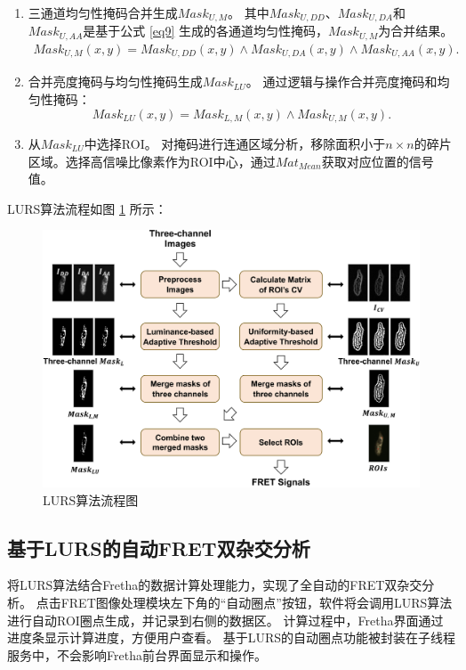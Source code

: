 \begin{enumerate}
\item {三通道均匀性掩码合并生成${Mask}_{U,M}$。}  
其中${Mask}_{U,DD}$、${Mask}_{U,DA}$和${Mask}_{U,AA}$是基于公式 \ref{eq9} 生成的各通道均匀性掩码，${Mask}_{U,M}$为合并结果。
\begin{equation}
    \begin{split}
    {Mask}_{U,M}(x,y)={Mask}_{U,DD}(x,y) \land {Mask}_{U,DA}(x,y) \land {Mask}_{U,AA}(x,y) .
    \end{split}
    \label{eq_merge_u}
\end{equation}
\item {合并亮度掩码与均匀性掩码生成${Mask}_{LU}$。}  
通过逻辑与操作合并亮度掩码和均匀性掩码：
\begin{equation}
    {Mask}_{LU}(x,y)={Mask}_{L,M}(x,y) \land {Mask}_{U,M}(x,y) .
    \label{eq10}
\end{equation}
\item {从${Mask}_{LU}$中选择ROI。}  
对掩码进行连通区域分析，移除面积小于$n \times n$的碎片区域。选择高信噪比像素作为ROI中心，通过${Mat}_{Mean}$获取对应位置的信号值。
\end{enumerate}

LURS算法流程如图 \ref{fig1} 所示：
\begin{figure}[!htbp]
\centering
\includegraphics[width=1\linewidth]{../figures/4/LURS流程图.drawio.png}
\caption{LURS算法流程图}\label{fig1}
\end{figure}

\subsection{基于LURS的自动FRET双杂交分析}
将LURS算法结合Fretha的数据计算处理能力，实现了全自动的FRET双杂交分析。
点击FRET图像处理模块左下角的“自动圈点”按钮，软件将会调用LURS算法进行自动ROI圈点生成，并记录到右侧的数据区。
计算过程中，Fretha界面通过进度条显示计算进度，方便用户查看。
基于LURS的自动圈点功能被封装在子线程服务中，不会影响Fretha前台界面显示和操作。

